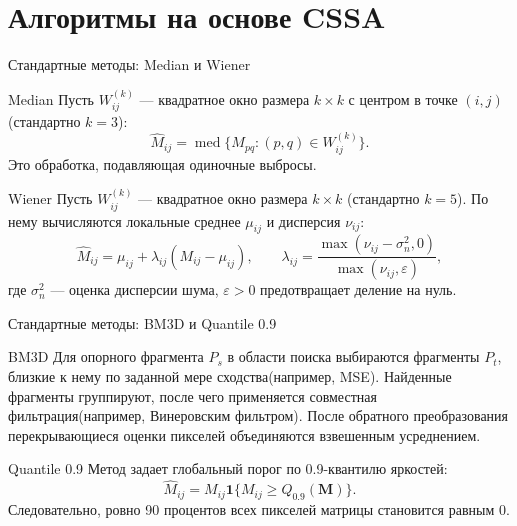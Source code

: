 \documentclass[unicode,notheorems]{beamer}
\begin{document}
\section{Алгоритмы на основе CSSA}

\begin{frame}{Стандартные методы: Median и Wiener}
	\scriptsize
	\begin{block}{Median}
		Пусть $W_{ij}^{(k)}$ --- квадратное окно размера $k\times k$ с центром в точке $(i,j)$ (стандартно $k=3$):
		\[
		\widehat M_{ij} =
		\operatorname{med}\{M_{pq}:(p,q)\in W_{ij}^{(k)}\}.
		\]
		Это обработка, подавляющая одиночные выбросы.
	\end{block}

	\begin{block}{Wiener}
		Пусть $W_{ij}^{(k)}$ --- квадратное окно размера $k\times k$ (стандартно $k=5$).
		По нему вычисляются локальные среднее $\mu_{ij}$ и дисперсия $\nu_{ij}$:
		\[
		\widehat M_{ij} =
		\mu_{ij}+\lambda_{ij}(M_{ij}-\mu_{ij}),\qquad
		\lambda_{ij}=
		\frac{\max(\nu_{ij}-\sigma_n^2,0)}{\max(\nu_{ij},\varepsilon)},
		\]
		где $\sigma_n^2$ --- оценка дисперсии шума, $\varepsilon>0$ предотвращает деление на нуль.
	\end{block}
\end{frame}

\begin{frame}{Стандартные методы: BM3D и Quantile 0.9}
	\scriptsize
	\begin{block}{BM3D}
		Для опорного фрагмента $P_s$ в области поиска выбираются фрагменты $P_t$, близкие к нему по заданной мере сходства(например, MSE).
		Найденные фрагменты группируют, после чего применяется совместная фильтрация(например, Винеровским фильтром).
		После обратного преобразования перекрывающиеся оценки пикселей объединяются взвешенным усреднением.
	\end{block}

	\begin{block}{Quantile 0.9}
		Метод задает глобальный порог по 0.9-квантилю яркостей:
		\[
		\widehat{M}_{ij}=M_{ij}\mathbf{1}\{M_{ij}\ge Q_{0.9}(\mathbf{M})\}.
		\]
		Следовательно, ровно 90 процентов всех пикселей матрицы становится равным 0.
	\end{block}
\end{frame}
\end{document}
